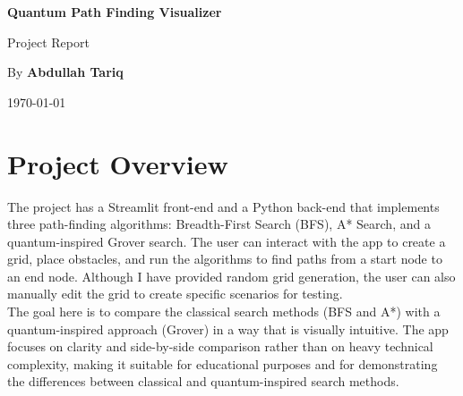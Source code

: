 \documentclass[12pt,a4paper]{article}
\begin{document}
\begin{titlepage}
    \centering
    \vspace*{1.5cm}
    {\Huge\bfseries\color{PrimaryBlue} Quantum Path Finding Visualizer\par}
    \vspace{0.5cm}
    {\Large Project Report\par}
    \vskip 1.5cm
    {\large\color{DarkText} By \textbf{Abdullah Tariq}\par}
    \vspace{1.5cm}
    \begin{minipage}{0.85\textwidth}
        \setlength{\fboxsep}{14pt}
        \color{DarkText}
    \end{minipage}
    \vfill
    {\large\today\par}
\end{titlepage}

\tableofcontents
\newpage

\section{Project Overview}
The project has a Streamlit front-end and a Python back-end that implements three path-finding algorithms: Breadth-First Search (BFS), A* Search, and a quantum-inspired Grover search.
The user can interact with the app to create a grid, place obstacles, and run the algorithms to find paths from a start node to an end node. 
Although I have provided random grid generation, the user can also manually edit the grid to create specific scenarios for testing. \\

The goal here is to compare the classical search methods (BFS and A*) with a quantum-inspired approach (Grover) in a way that is visually intuitive.
The app focuses on clarity and side-by-side comparison rather than on heavy technical complexity, making it suitable for educational purposes and for demonstrating the differences between classical and quantum-inspired search methods.
\end{document}
